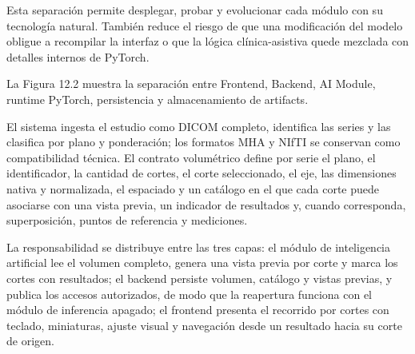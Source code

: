 
Esta separación permite desplegar, probar y evolucionar cada módulo con su tecnología natural. También reduce el riesgo de que una modificación del modelo obligue a recompilar la interfaz o que la lógica clínica-asistiva quede mezclada con detalles internos de PyTorch.

La Figura 12.2 muestra la separación entre Frontend, Backend, AI Module, runtime PyTorch, persistencia y almacenamiento de artifacts.


El sistema ingesta el estudio como DICOM completo, identifica las series y las clasifica por plano y ponderación; los formatos MHA y NIfTI se conservan como compatibilidad técnica. El contrato volumétrico define por serie el plano, el identificador, la cantidad de cortes, el corte seleccionado, el eje, las dimensiones nativa y normalizada, el espaciado y un catálogo en el que cada corte puede asociarse con una vista previa, un indicador de resultados y, cuando corresponda, superposición, puntos de referencia y mediciones.

La responsabilidad se distribuye entre las tres capas: el módulo de inteligencia artificial lee el volumen completo, genera una vista previa por corte y marca los cortes con resultados; el backend persiste volumen, catálogo y vistas previas, y publica los accesos autorizados, de modo que la reapertura funciona con el módulo de inferencia apagado; el frontend presenta el recorrido por cortes con teclado, miniaturas, ajuste visual y navegación desde un resultado hacia su corte de origen.



